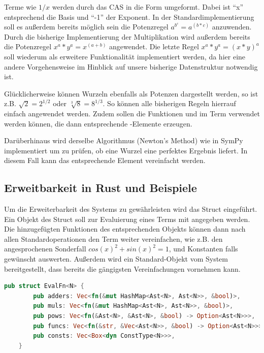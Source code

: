 \documentclass[11pt,a4paper, ngerman]{article}
\begin{document}
Terme wie $1/x$ werden durch das CAS in die Form  umgeformt. Dabei ist ``x'' entsprechend die Basis und ``-1'' der Exponent. In der Standardimplementierung soll es außerdem bereits möglich sein die Potenzregel $a^{b^{c}} = a^{(b*c)}$ anzuwenden. Durch die bisherige Implementierung der Multiplikation wird außerdem bereits die Potenzregel $x^a*y^a = x^{(a+b)}$ angewendet. Die letzte Regel $x^a*y^a = (x*y)^a$ soll wiederum als erweitere Funktionalität implementiert werden, da hier eine andere Vorgehensweise im Hinblick auf unsere bisherige Datenstruktur notwendig ist.

Glücklicherweise können Wurzeln ebenfalls als Potenzen dargestellt werden, so ist z.B. $\sqrt{2} = 2^{1/2}$ oder $\sqrt[3]{8} = 8^{1/3}$. So können alle bisherigen Regeln hierrauf einfach angewendet werden. Zudem sollen die Funktionen  und  im Term verwendet werden können, die dann entsprechende -Elemente erzeugen.

Darüberhinaus wird derselbe Algorithmus (Newton's Method) wie in SymPy implementiert um zu prüfen, ob eine Wurzel eine perfektes Ergebnis liefert. In diesem Fall kann das entsprechende Element vereinfacht werden.

\subsection{Erweitbarkeit in Rust und Beispiele}
Um die Erweiterbarkeit des Systems zu gewährleisten wird das Struct  eingeführt. Ein Objekt des Struct soll zur Evaluierung eines Terms mit angegeben werden. Die hinzugefügten Funktionen des entsprechenden Objekts können dann nach allen Standardoperationen den Term weiter vereinfachen, wie z.B. den angesprochenen Sonderfall $cos(x)^2+sin(x)^2 = 1$, und Konstanten falls gewünscht auswerten. Außerdem wird ein Standard-Objekt vom System bereitgestellt, dass bereits die gängigsten Vereinfachungen vornehmen kann.

\begin{lstlisting}[language=rust, caption={Defintion EvalFn}]
    pub struct EvalFn<N> {
        pub adders: Vec<fn(&mut HashMap<Ast<N>, Ast<N>>, &bool)>,
        pub muls: Vec<fn(&mut HashMap<Ast<N>, Ast<N>>, &bool)>,
        pub pows: Vec<fn(&Ast<N>, &Ast<N>, &bool) -> Option<Ast<N>>>,
        pub funcs: Vec<fn(&str, &Vec<Ast<N>>, &bool) -> Option<Ast<N>>>,
        pub consts: Vec<Box<dyn ConstType<N>>>,
    }
\end{lstlisting}
\end{document}
